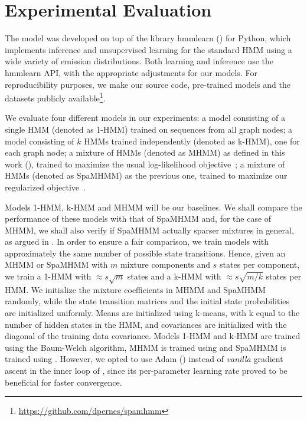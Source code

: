 \section{Experimental Evaluation}
\label{sec:experiments}
The model was developed on top of the library hmmlearn (\citet{hmmlearn}) for Python, which implements inference and unsupervised learning for the standard HMM using a wide variety of emission distributions. Both learning and inference use the hmmlearn API, with the appropriate adjustments for our models. For reproducibility purposes, we make our source code, pre-trained models and the datasets publicly available\footnote{\url{https://github.com/dpernes/spamhmm}}.

We evaluate four different models in our experiments: a model consisting of a single HMM (denoted as 1-HMM) trained on sequences from all graph nodes; a model consisting of $k$ HMMs trained independently (denoted as k-HMM), one for each graph node; a mixture of HMMs (denoted as MHMM) as defined in this work (), trained to maximize the usual log-likelihood objective~; a mixture of HMMs (denoted as SpaMHMM) as the previous one, trained to maximize our regularized objective~.

Models 1-HMM, k-HMM and MHMM will be our baselines. We shall compare the performance of these models with that of SpaMHMM and, for the case of MHMM, we shall also verify if SpaMHMM actually sparser mixtures in general, as argued in . In order to ensure a fair comparison, we train models with approximately the same number of possible state transitions. Hence, given an MHMM or SpaMHMM with $m$ mixture components and $s$ states per component, we train a 1-HMM with $\approx s\sqrt{m}$ states and a k-HMM with $\approx s\sqrt{m/k}$ states per HMM. We initialize the mixture coefficients in MHMM and SpaMHMM randomly, while the state transition matrices and the initial state probabilities are initialized uniformly. Means are initialized using k-means, with k equal to the number of hidden states in the HMM, and covariances are initialized with the diagonal of the training data covariance. Models 1-HMM and k-HMM are trained using the Baum-Welch algorithm, MHMM is trained using  and SpaMHMM is trained using . However, we opted to use Adam (\citet{Kingma2014}) instead of \textit{vanilla} gradient ascent in the inner loop of , since its per-parameter learning rate proved to be beneficial for faster convergence.

